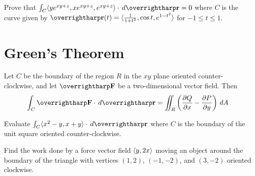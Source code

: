 \documentclass[letterpaper, twoside, 12pt]{book}
\begin{document}
          \begin{problem}
            Prove that
            $\int_C\<ye^{xy+z},xe^{xy+z},e^{xy+z}\>\cdot\dvar{\vect r}=0$
            where $C$ is the curve given by
            $\vect{r}(t)=\<\frac{1}{1+t^2},\cos t,e^{1-t^2}\>$
            for $-1 \leq t \leq 1$.
          \end{problem}

          \begin{solution}

          \end{solution}

          \begin{contributors}

          \end{contributors}


\section{Green's Theorem} %

\begin{theorem}
  Let $C$ be the boundary of the region $R$ in the $xy$ plane oriented
  counter-clockwise, and let $\vect{F}$ be a two-dimensional vector field. Then
  \[
    \int_C \vect{F}\cdot\dvar{\vect{r}}
      =
    \iint_R \left(\frac{\p Q}{\p x}-\frac{\p P}{\p y}\right)\dvar{A}
  \]
\end{theorem}

          \begin{problem}
            Evaluate $\int_C\<x^2-y,x+y\>\cdot\dvar{\vect r}$ where
            $C$ is the boundary of the unit square oriented counter-clockwise.
          \end{problem}

          \begin{solution}

          \end{solution}

          \begin{contributors}

          \end{contributors}

          \begin{problem}
            Find the work done by a force vector field $\langle y,2x\rangle$ moving an
            object around the
            boundary of the triangle with vertices $(1,2)$, $(-1,-2)$, and
            $(3,-2)$ oriented clockwise.
          \end{problem}

          \begin{solution}

          \end{solution}

          \begin{contributors}

          \end{contributors}
\end{document}
